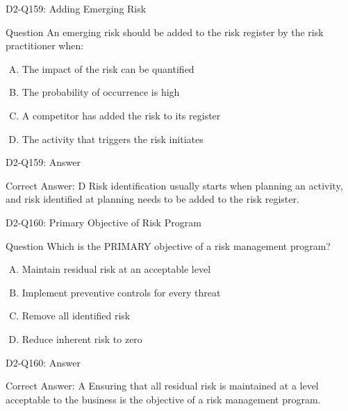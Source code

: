 \documentclass{beamer}
\begin{document}
	\begin{frame}{D2-Q159: Adding Emerging Risk}
		\begin{block}{Question}
			An emerging risk should be added to the risk register by the risk practitioner when:
		\end{block}
		\begin{enumerate}[(A)]
			\item The impact of the risk can be quantified
			\item The probability of occurrence is high
			\item A competitor has added the risk to its register
			\item The activity that triggers the risk initiates
		\end{enumerate}
	\end{frame}
	\begin{frame}{D2-Q159: Answer}
		\begin{block}{Correct Answer: D}
			Risk identification usually starts when planning an activity, and risk identified at planning needs to be added to the risk register.
		\end{block}
	\end{frame}
	
	\begin{frame}{D2-Q160: Primary Objective of Risk Program}
		\begin{block}{Question}
			Which is the PRIMARY objective of a risk management program?
		\end{block}
		\begin{enumerate}[(A)]
			\item Maintain residual risk at an acceptable level
			\item Implement preventive controls for every threat
			\item Remove all identified risk
			\item Reduce inherent risk to zero
		\end{enumerate}
	\end{frame}
	\begin{frame}{D2-Q160: Answer}
		\begin{block}{Correct Answer: A}
			Ensuring that all residual risk is maintained at a level acceptable to the business is the objective of a risk management program.
		\end{block}
	\end{frame}
	
\end{document}
